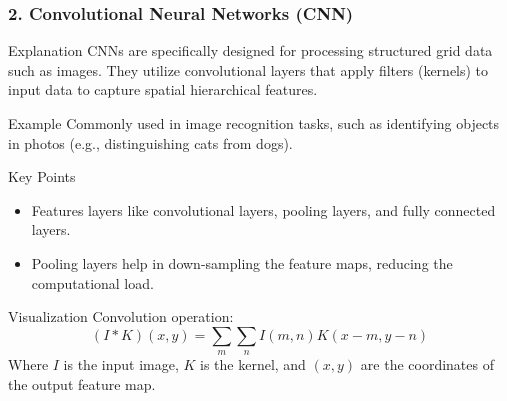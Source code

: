 \documentclass[aspectratio=169]{beamer}
\begin{document}
\begin{frame}[fragile]
  \frametitle{2. Convolutional Neural Networks (CNN)}
  \begin{block}{Explanation}
    CNNs are specifically designed for processing structured grid data such as images. They utilize convolutional layers that apply filters (kernels) to input data to capture spatial hierarchical features.
  \end{block}

  \begin{block}{Example}
    Commonly used in image recognition tasks, such as identifying objects in photos (e.g., distinguishing cats from dogs).
  \end{block}
  
  \begin{block}{Key Points}
    \begin{itemize}
      \item Features layers like convolutional layers, pooling layers, and fully connected layers.
      \item Pooling layers help in down-sampling the feature maps, reducing the computational load.
    \end{itemize}
  \end{block}

  \begin{block}{Visualization}
    Convolution operation:
    \begin{equation}
      (I * K)(x,y) = \sum_{m}\sum_{n}I(m,n)K(x-m,y-n)
    \end{equation}
    Where \(I\) is the input image, \(K\) is the kernel, and \((x,y)\) are the coordinates of the output feature map.
  \end{block}
\end{frame}
\end{document}
